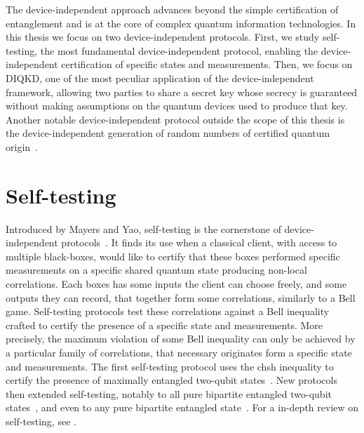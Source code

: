The device-independent approach advances beyond the simple certification of entanglement and is at the core of complex quantum information technologies.
In this thesis we focus on two device-independent protocols.
First, we study self-testing, the most fundamental device-independent protocol, enabling the device-independent certification of specific states and measurements.
Then, we focus on \acrfull{DIQKD}, one of the most peculiar application of the device-independent framework, allowing two parties to share a secret key whose secrecy is guaranteed without making assumptions on the quantum devices used to produce that key.
Another notable device-independent protocol outside the scope of this thesis is the device-independent generation of random numbers of certified quantum origin~\cite{Acin2016,Liu2018}.


\section{Self-testing}

Introduced by Mayers and Yao, self-testing is the cornerstone of device-independent protocols~\cite{Mayers2004}.
It finds its use when a classical client, with access to multiple black-boxes, would like to certify that these boxes performed specific measurements on a specific shared quantum state producing non-local correlations.
Each boxes has some inputs the client can choose freely, and some outputs they can record, that together form some correlations, similarly to a Bell game.
Self-testing protocols test these correlations against a Bell inequality crafted to certify the presence of a specific state and measurements.
More precisely, the maximum violation of some Bell inequality can only be achieved by a particular family of correlations, that necessary originates form a specific state and measurements.
The first self-testing protocol uses the \acrshort{chsh} inequality to certify the presence of maximally entangled two-qubit states~\cite{Mayers2004}. 
New protocols then extended self-testing, notably to all pure bipartite entangled two-qubit states~\cite{Yang2013,Bamps2015}, and even to any pure bipartite entangled state~\cite{Coladangelo2017}. 
For a in-depth review on self-testing, see \cite{Supic2019}.

